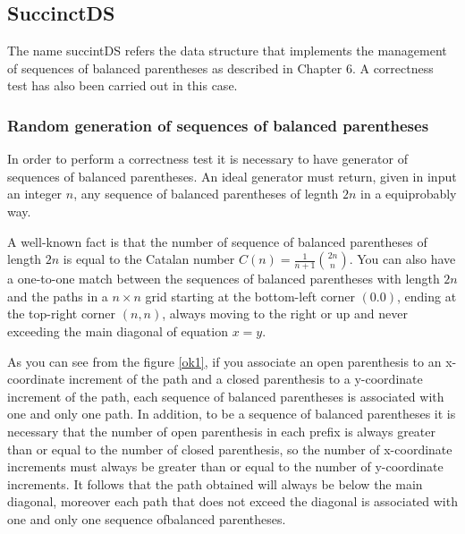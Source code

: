 \documentclass{article}
\newcommand\catalannumber[4]{
  \fill[cyan!25]  (0,- #1 - 1) rectangle +(#2,#1);
  \draw (0, - #1 -1) grid +(#2,#1);
  
  \draw[dashed] (0,-#1 - 1 + #4) -- +(#1 - #4,#1 - #4);
  \coordinate (prev) at (0, - #1 -1);
  \foreach \dir in {#3}{
    \ifnum\dir=0
    \coordinate (dep) at (1,0);
    \else
        \ifnum\dir=1
        \coordinate (dep) at (0,1);
        \else
            \ifnum\dir=2
            \coordinate (dep) at (-1,0);
            \else
            \coordinate (dep) at (0,-1);
            \fi
        \fi
    \fi
    \draw[line width=2pt,-stealth,red] (prev) -- ++(dep) coordinate (prev);
  };
}
\begin{document}
\subsection{SuccinctDS}
The name succintDS refers the data structure that implements the management of sequences of balanced parentheses as described in Chapter 6. A correctness test has also been carried out in this case.


\subsubsection{Random generation of sequences of balanced parentheses}
In order to perform a correctness test it is necessary to have generator of sequences of balanced parentheses. An ideal generator must return, given in input an integer $n$, any sequence of balanced parentheses of legnth $2n$ in a equiprobably way.

A well-known fact is that the number of sequence of balanced parentheses of length $2n$ is equal to the Catalan number $C(n) = \frac{1}{n+1}\binom{2n}{n}$. You can also have a one-to-one match between the sequences of balanced parentheses with length $2n$ and the paths in a $n\times n$ grid starting at the bottom-left corner $(0.0)$, ending at the top-right corner $(n,n)$, always moving to the right or up and never exceeding the main diagonal of equation $x=y$.

\begin{center}
    \captionsetup{type=figure, width=.76\linewidth}
    \label{ok1}
\end{center}
As you can see from the figure \ref{ok1}, if you associate an open parenthesis to an x-coordinate increment of the path and a closed parenthesis to a y-coordinate increment of the path, each sequence of balanced parentheses is associated with one and only one path. In addition, to be a sequence of balanced parentheses it is necessary that the number of open parenthesis in each prefix is always greater than or equal to the number of closed parenthesis, so the number of x-coordinate increments must always be greater than or equal to the number of y-coordinate increments. It follows that the path obtained will always be below the main diagonal, moreover each path that does not exceed the diagonal is associated with one and only one sequence ofbalanced parentheses.
\end{document}
